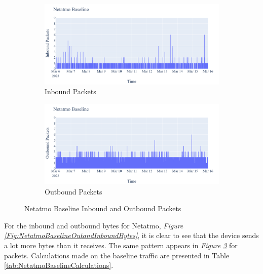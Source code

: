  \begin{figure}[H]
    \centering
    \begin{subfigure}[b]{0.7\textwidth}
        \includegraphics[width=\textwidth]{figures/Netatmo_Baseline_InboundPackets.png}
        \caption{Inbound Packets}
        \label{fig:NetatmoBaselineInboundPackets}
    \end{subfigure}
    \begin{subfigure}[b]{0.7\textwidth}
        \includegraphics[width=\textwidth]{figures/Netatmo_Baseline_OutboundPackets.png}
        \caption{Outbound Packets}
        \label{fig:NetatmoBaselineOutboundPackets}
    \end{subfigure}
    \caption{Netatmo Baseline Inbound and Outbound Packets}
    \label{Fig:NetatmoBaselineOutandInboundPackets}
 \end{figure}
For the inbound and outbound bytes for Netatmo, \textit{Figure \ref{Fig:NetatmoBaselineOutandInboundBytes}}, it is clear to see that the device sends a lot more bytes than it receives. The same pattern appears in \textit{Figure \ref{Fig:NetatmoBaselineOutandInboundPackets}} for packets. Calculations made on the baseline traffic are presented in Table \ref{tab:NetatmoBaselineCalculations}. 
